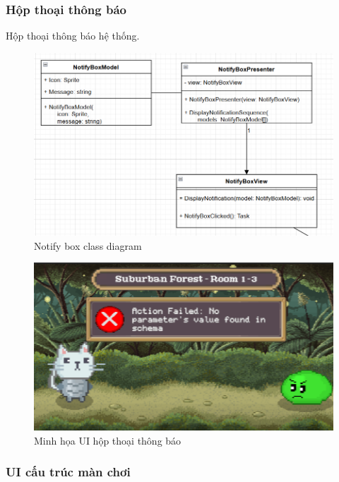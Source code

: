 \subsubsection{Hộp thoại thông báo}

Hộp thoại thông báo hệ thống.

\begin{figure}[H]
	\centering
	\includegraphics[width=13cm]{Images/NotifyBoxView.png}
	\vspace{0.5cm}
	\caption{Notify box class diagram}
\end{figure}

\begin{figure}[H]
	\centering
	\includegraphics[width=13cm]{Images/NotifyBoxUI.png}
	\vspace{0.5cm}
	\caption{Minh họa UI hộp thoại thông báo}
\end{figure}

\subsubsection{UI cấu trúc màn chơi}

